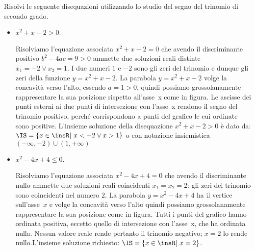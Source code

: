 \begin{esempio}
Risolvi le seguente disequazioni utilizzando lo studio del segno del trinomio 
di secondo grado.



\begin{comment}
\begin{minipage}{.49\linewidth}
 
\end{minipage}
\hfill
\begin{minipage}{.49\linewidth}
 
\end{minipage}
\end{comment}

\begin{itemize}
\item $x^2+x-2>0$.

\begin{minipage}{.76\linewidth}
 Risolviamo l'equazione associata $x^2+x-2=0$ che avendo il discriminante 
positivo $b^2-4ac=9>0$ ammette due soluzioni reali distinte $x_1=-2\vee 
x_2=1$. 
I due numeri $1$ e $-2$ sono gli zeri del trinomio e dunque gli zeri della 
funzione $y=x^2+x-2$. La parabola $y=x^2+x-2$ volge la concavità verso 
l'alto, 
essendo $a=1>0$, quindi possiamo grossolanamente rappresentare la sua 
posizione rispetto all'asse~x come in figura.
Le ascisse dei punti esterni ai due punti di intersezione con l'asse~x 
rendono il segno del trinomio positivo, perché corrispondono a punti del 
grafico le cui ordinate sono positive. 
L'insieme soluzione della disequazione 
$x^2+x-2>0$ è dato da: $\IS=\{x\in \insR\text{{\textbar} }x<-2\vee x>1\}$ o 
con 
notazione insiemistica $(-\infty,-2)\cup (1,+\infty )$
\end{minipage}
\hfill
\begin{minipage}{.22\linewidth}
 \parabolaa
\end{minipage}

\item $x^2-4x+4\le 0$.

\begin{minipage}{.76\linewidth}
Risolviamo l'equazione associata $x^2-4x+4=0$ che avendo il discriminante 
nullo 
ammette due soluzioni reali coincidenti $x_1=x_2=2$: gli zeri del trinomio 
sono 
coincidenti nel numero $2$. 
La parabola $y=x^2-4x+4$ ha il vertice sull'asse~$x$ 
e volge la concavità verso l'alto quindi possiamo grossolanamente 
rappresentare 
la sua posizione come in figura.
Tutti i punti del grafico hanno ordinata positiva, eccetto 
quello di intersezione con l'asse~x, che ha ordinata nulla. Nessun valore 
reale rende pertanto il trinomio negativo; $x=2$ lo rende nullo.L'insieme 
soluzione richiesto: $\IS=\{x\in \insR\text{{\textbar} }x=2\}$.
\end{minipage}
\hfill
\begin{minipage}{.22\linewidth}
 \parabolab
\end{minipage}


\end{itemize}
\end{esempio}
